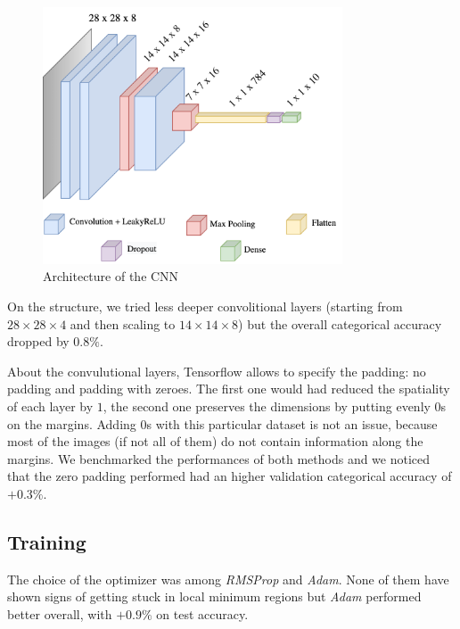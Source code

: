 \documentclass[compsoc]{IEEEtran}
\begin{document}
\begin{figure}[ht!]
\centering                                                                        
\includegraphics[width=3.5in]{cnn.png}
\captionsetup{justification=centering}                                                                                         
\caption{Architecture of the CNN}
\label{fig:cnn}                                                                                                                               
\end{figure}

On the structure, we tried less deeper convolitional layers (starting from $28\times28\times4$ and then scaling to $14\times14\times8$) but the overall categorical accuracy dropped by $0.8\%$.

About the convulutional layers, Tensorflow allows to specify the padding: no padding and padding with zeroes. The first one would had reduced the spatiality of each layer by $1$, the second one preserves the dimensions by putting evenly $0$s on the margins. Adding $0$s with this particular dataset is not an issue, because most of the images (if not all of them) do not contain information along the margins.
We benchmarked the performances of both methods and we noticed that the zero padding performed had an higher validation categorical accuracy of $+0.3\%$.




\subsection{Training}
The choice of the optimizer was among \emph{RMSProp} and \emph{Adam}. 
None of them have shown signs of getting stuck in local minimum regions but \emph{Adam} performed better overall, with $+0.9\%$ on test accuracy. \par
\end{document}
